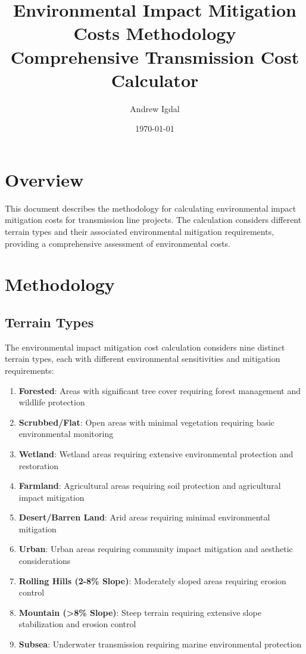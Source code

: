 \documentclass[12pt]{article}
\title{Environmental Impact Mitigation Costs Methodology\\Comprehensive Transmission Cost Calculator}
\author{Andrew Igdal}
\date{\today}
\begin{document}
\maketitle

\section{Overview}
This document describes the methodology for calculating environmental impact mitigation costs for transmission line projects. The calculation considers different terrain types and their associated environmental mitigation requirements, providing a comprehensive assessment of environmental costs.

\section{Methodology}

\subsection{Terrain Types}
The environmental impact mitigation cost calculation considers nine distinct terrain types, each with different environmental sensitivities and mitigation requirements:

\begin{enumerate}
    \item \textbf{Forested}: Areas with significant tree cover requiring forest management and wildlife protection
    \item \textbf{Scrubbed/Flat}: Open areas with minimal vegetation requiring basic environmental monitoring
    \item \textbf{Wetland}: Wetland areas requiring extensive environmental protection and restoration
    \item \textbf{Farmland}: Agricultural areas requiring soil protection and agricultural impact mitigation
    \item \textbf{Desert/Barren Land}: Arid areas requiring minimal environmental mitigation
    \item \textbf{Urban}: Urban areas requiring community impact mitigation and aesthetic considerations
    \item \textbf{Rolling Hills (2-8\% Slope)}: Moderately sloped areas requiring erosion control
    \item \textbf{Mountain (>8\% Slope)}: Steep terrain requiring extensive slope stabilization and erosion control
    \item \textbf{Subsea}: Underwater transmission requiring marine environmental protection
\end{enumerate}
\end{document}
